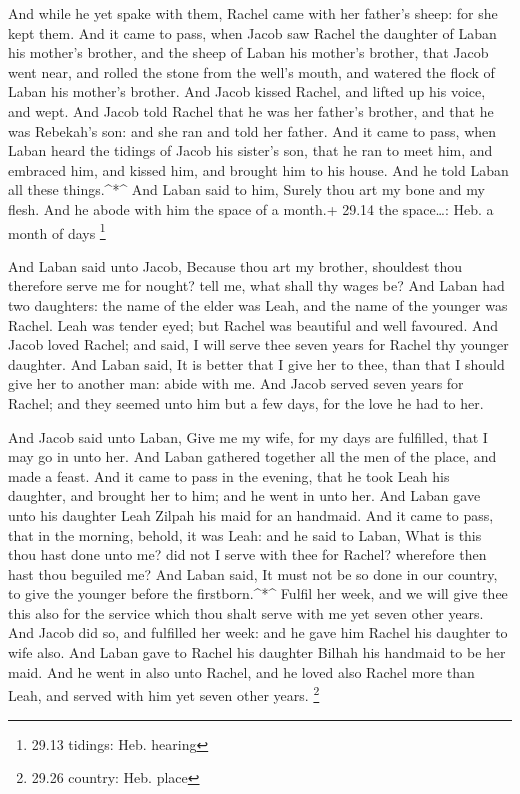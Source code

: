  And while he yet spake with them, Rachel came with her
father's sheep: for she kept them.  And it came to pass,
when Jacob saw Rachel the daughter of Laban his mother's brother, and
the sheep of Laban his mother's brother, that Jacob went near, and
rolled the stone from the well's mouth, and watered the flock of Laban
his mother's brother.  And Jacob kissed Rachel, and lifted
up his voice, and wept.  And Jacob told Rachel that he was
her father's brother, and that he was Rebekah's son: and she ran and
told her father.  And it came to pass, when Laban heard the
tidings of Jacob his sister's son, that he ran to meet him, and embraced
him, and kissed him, and brought him to his house. And he told Laban all
these things.\^{}*\^{}  And Laban said to him, Surely thou
art my bone and my flesh. And he abode with him the space of a month.+
29.14 the space\ldots: Heb. a month of days \footnote{29.13 tidings:
  Heb. hearing}

 And Laban said unto Jacob, Because thou art my brother,
shouldest thou therefore serve me for nought? tell me, what shall thy
wages be?  And Laban had two daughters: the name of the
elder was Leah, and the name of the younger was Rachel. 
Leah was tender eyed; but Rachel was beautiful and well favoured.
 And Jacob loved Rachel; and said, I will serve thee seven
years for Rachel thy younger daughter.  And Laban said, It
is better that I give her to thee, than that I should give her to
another man: abide with me.  And Jacob served seven years
for Rachel; and they seemed unto him but a few days, for the love he had
to her.

 And Jacob said unto Laban, Give me my wife, for my days
are fulfilled, that I may go in unto her.  And Laban
gathered together all the men of the place, and made a feast.
 And it came to pass in the evening, that he took Leah his
daughter, and brought her to him; and he went in unto her. 
And Laban gave unto his daughter Leah Zilpah his maid for an handmaid.
 And it came to pass, that in the morning, behold, it was
Leah: and he said to Laban, What is this thou hast done unto me? did not
I serve with thee for Rachel? wherefore then hast thou beguiled me?
 And Laban said, It must not be so done in our country, to
give the younger before the firstborn.\^{}*\^{}  Fulfil her
week, and we will give thee this also for the service which thou shalt
serve with me yet seven other years.  And Jacob did so, and
fulfilled her week: and he gave him Rachel his daughter to wife also.
 And Laban gave to Rachel his daughter Bilhah his handmaid
to be her maid.  And he went in also unto Rachel, and he
loved also Rachel more than Leah, and served with him yet seven other
years. \footnote{29.26 country: Heb. place}

